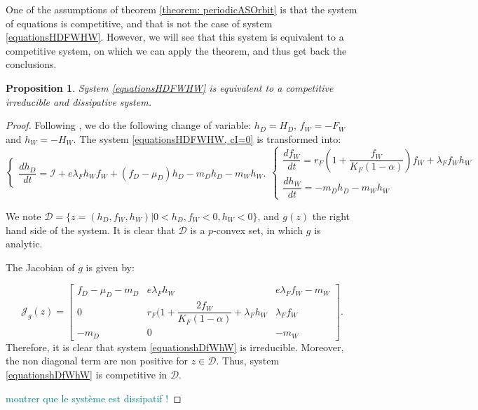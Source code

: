 \documentclass{article}
\newcommand{\lfw}{\lambda_{F}}
\newcommand{\lfw}{\lambda_{F}}
\newcommand{\cI}{\mathcal{I}}
\newcommand{\marc}[1]{\textcolor{teal}{#1}}
\newtheorem{prop}{Proposition}
\begin{document}
One of the assumptions of theorem \eqref{theorem: periodicASOrbit} is that the system of equations is competitive, and that is not the case of system \eqref{equationsHDFWHW}. However, we will see that this system is equivalent to a competitive system, on which we can apply the theorem, and thus get back the conclusions.

\begin{prop}
System \eqref{equationsHDFWHW} is equivalent to a competitive irreducible and dissipative system.
\end{prop}

\begin{proof}
Following \cite{wang_predator-prey_1997}, we do the following change of variable: $h_D =  H_D$, $f_W = -F_W$ and $h_W = -H_W$.  The system \eqref{equationsHDFWHW, cI=0} is transformed into:
\begin{subequations}
\begin{equation}
\left\{ \begin{array}{l}
\dfrac{dh_D}{dt}= \cI + e\lfw h_W f_W + (f_D - \mu_D) h_D - m_D h_D - m_W h_W.
\end{array}\right.
\end{equation}
\begin{equation}
\left\lbrace \begin{array}{l}
\dfrac{df_W}{dt} = r_F \left(1 + \dfrac{f_W}{K_F(1-\alpha)} \right) f_W + \lfw f_W h_W \\
\dfrac{dh_W}{dt}= -m_D h_D - m_W h_W 
\end{array} \right.
\end{equation}
\label{equationshDfWhW}
\end{subequations}

We note $\mathcal{D} = \Big\{z = (h_D, f_W, h_W) | 0 < h_D, f_W < 0, h_W < 0 \Big\}$, and $g(z)$ the right hand side of the system. It is clear that $\mathcal{D}$ is a $p$-convex set, in which $g$ is analytic.

The Jacobian of $g$ is given by:

\begin{equation*}
\mathcal{J}_g(z) = \begin{bmatrix}
f_D -\mu_D - m_D & e \lfw h_W & e \lfw f_W - m_W \\
0 & r_F \Big(1 + \dfrac{2 f_W}{K_F(1-\alpha)} + \lfw h_W & \lfw f_W \\
-m_D & 0 & -m_W
\end{bmatrix}.
\end{equation*}
Therefore, it is clear that system \eqref{equationshDfWhW} is irreducible. Moreover, the non diagonal term are non positive for $z \in \mathcal{D}$. Thus, system \eqref{equationshDfWhW} is competitive in $\mathcal{D}$.

\marc{montrer que le système est dissipatif !}


\end{proof}
\end{document}
